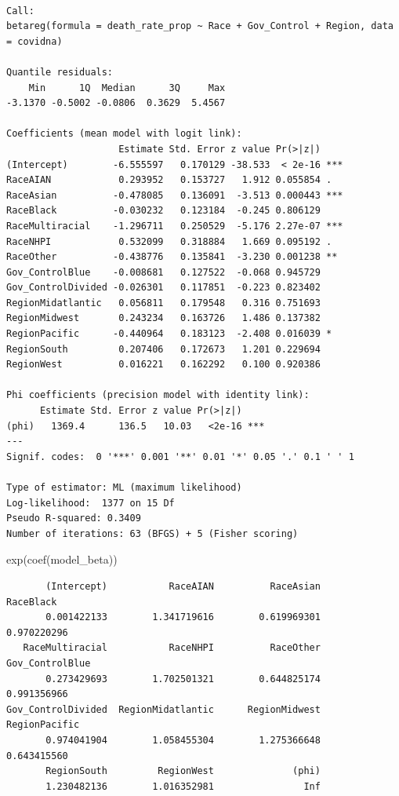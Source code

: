 \documentclass[
  letterpaper,
  DIV=11,
  numbers=noendperiod]{scrartcl}
\newenvironment{Shaded}{\begin{snugshade}}{\end{snugshade}}
\newcommand{\FunctionTok}[1]{\textcolor[rgb]{0.28,0.35,0.67}{#1}}
\newcommand{\NormalTok}[1]{\textcolor[rgb]{0.00,0.23,0.31}{#1}}
\begin{document}
\begin{verbatim}

Call:
betareg(formula = death_rate_prop ~ Race + Gov_Control + Region, data = covidna)

Quantile residuals:
    Min      1Q  Median      3Q     Max 
-3.1370 -0.5002 -0.0806  0.3629  5.4567 

Coefficients (mean model with logit link):
                    Estimate Std. Error z value Pr(>|z|)    
(Intercept)        -6.555597   0.170129 -38.533  < 2e-16 ***
RaceAIAN            0.293952   0.153727   1.912 0.055854 .  
RaceAsian          -0.478085   0.136091  -3.513 0.000443 ***
RaceBlack          -0.030232   0.123184  -0.245 0.806129    
RaceMultiracial    -1.296711   0.250529  -5.176 2.27e-07 ***
RaceNHPI            0.532099   0.318884   1.669 0.095192 .  
RaceOther          -0.438776   0.135841  -3.230 0.001238 ** 
Gov_ControlBlue    -0.008681   0.127522  -0.068 0.945729    
Gov_ControlDivided -0.026301   0.117851  -0.223 0.823402    
RegionMidatlantic   0.056811   0.179548   0.316 0.751693    
RegionMidwest       0.243234   0.163726   1.486 0.137382    
RegionPacific      -0.440964   0.183123  -2.408 0.016039 *  
RegionSouth         0.207406   0.172673   1.201 0.229694    
RegionWest          0.016221   0.162292   0.100 0.920386    

Phi coefficients (precision model with identity link):
      Estimate Std. Error z value Pr(>|z|)    
(phi)   1369.4      136.5   10.03   <2e-16 ***
---
Signif. codes:  0 '***' 0.001 '**' 0.01 '*' 0.05 '.' 0.1 ' ' 1 

Type of estimator: ML (maximum likelihood)
Log-likelihood:  1377 on 15 Df
Pseudo R-squared: 0.3409
Number of iterations: 63 (BFGS) + 5 (Fisher scoring) 
\end{verbatim}

\begin{Shaded}
\begin{Highlighting}[]
\FunctionTok{exp}\NormalTok{(}\FunctionTok{coef}\NormalTok{(model\_beta))}
\end{Highlighting}
\end{Shaded}

\begin{verbatim}
       (Intercept)           RaceAIAN          RaceAsian          RaceBlack 
       0.001422133        1.341719616        0.619969301        0.970220296 
   RaceMultiracial           RaceNHPI          RaceOther    Gov_ControlBlue 
       0.273429693        1.702501321        0.644825174        0.991356966 
Gov_ControlDivided  RegionMidatlantic      RegionMidwest      RegionPacific 
       0.974041904        1.058455304        1.275366648        0.643415560 
       RegionSouth         RegionWest              (phi) 
       1.230482136        1.016352981                Inf 
\end{verbatim}
\end{document}
